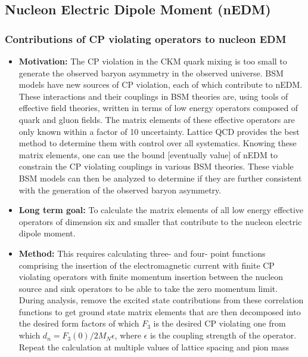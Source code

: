 \documentclass[12pt,hyperpdf]{article}
\begin{document}
\subsection{Nucleon Electric Dipole Moment (nEDM)}\label{sec:nEDM}

\subsubsection{Contributions of CP violating operators to nucleon EDM}
\begin{itemize}
    \item{\bf Motivation:} The CP violation in the CKM quark mixing is too
      small to generate the observed baryon asymmetry in the observed
      universe.  BSM models have new sources of CP violation, each of
      which contribute to nEDM. These interactions and their couplings
      in BSM theories are, using tools of effective field theories,
      written in terms of low energy operators composed of quark and
      gluon fields. The matrix elements of these effective operators
      are only known within a factor of 10 uncertainty.  Lattice QCD
      provides the best method to determine them with control over all
      systematics. Knowing these matrix elements, one can use the bound
      [eventually value] of nEDM to constrain the CP violating
      couplings in various BSM theories.  These viable BSM models can
      then be analyzed to determine if they are further consistent
      with the generation of the observed baryon asymmetry.
    \item{\bf Long term goal:} To calculate the matrix elements of all low
      energy effective operators of dimension six 
      and smaller that contribute to the nucleon electric dipole moment. 
    \item{\bf Method:} This requires calculating three- and four- point
      functions comprising the insertion of the electromagnetic
      current with finite CP violating operators with finite momentum
      insertion between the nucleon source and sink operators to be
      able to take the zero momentum limit.  During analysis, remove
      the excited state contributions from these correlation functions
      to get ground state matrix elements that are then decomposed
      into the desired form factors of which $F_3$ is the desired CP
      violating one from which $d_n = F_3(0)/2 M_N \epsilon$, where
      $\epsilon $ is the coupling strength of the operator. Repeat the
      calculation at multiple values of lattice spacing and pion mass

\end{itemize}
\end{document}
